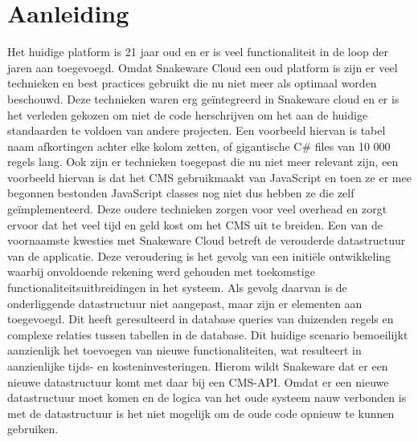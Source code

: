 \section{Aanleiding} 
Het huidige platform is 21 jaar oud en er is veel functionaliteit in de loop der jaren aan toegevoegd.
Omdat Snakeware Cloud een oud platform is zijn er veel technieken en best practices gebruikt die nu niet meer als optimaal worden beschouwd.
Deze technieken waren erg geïntegreerd in Snakeware cloud en er is het verleden gekozen om niet de code herschrijven om het aan de huidige standaarden te voldoen van andere projecten.
Een voorbeeld hiervan is tabel naam afkortingen achter elke kolom zetten, of gigantische C\# files van 10 000 regels lang. 
Ook zijn er technieken toegepast die nu niet meer relevant zijn, een voorbeeld hiervan is dat het \gls{CMS} gebruikmaakt van JavaScript en toen ze er mee begonnen bestonden JavaScript classes nog niet dus hebben ze die zelf geïmplementeerd.
Deze oudere technieken zorgen voor veel overhead en zorgt ervoor dat het veel tijd en geld kost om het CMS uit te breiden.
\whitespace
Een van de voornaamste kwesties met Snakeware Cloud betreft de verouderde datastructuur van de applicatie.
Deze veroudering is het gevolg van een initiële ontwikkeling waarbij onvoldoende rekening werd gehouden met toekomstige functionaliteitsuitbreidingen in het systeem.
Als gevolg daarvan is de onderliggende datastructuur niet aangepast, maar zijn er elementen aan toegevoegd.
Dit heeft geresulteerd in database queries van duizenden regels en complexe relaties tussen tabellen in de database.
Dit huidige scenario bemoeilijkt aanzienlijk het toevoegen van nieuwe functionaliteiten, wat resulteert in aanzienlijke tijds- en kosteninvesteringen.
\whitespace
Hierom wildt Snakeware dat er een nieuwe datastructuur komt met daar bij een \gls{CMS}-API.
Omdat er een nieuwe datastructuur moet komen en de logica van het oude systeem nauw verbonden is met de
datastructuur is het niet mogelijk om de oude code opnieuw te kunnen gebruiken.
